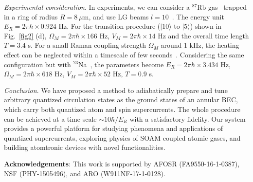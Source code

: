 \documentclass[twocolumn,prl,floatfix,citeautoscript,nofootinbib]{revtex4-1}
\begin{document}
\emph{Experimental consideration}. In experiments, we can consider a ${}^{87}
$Rb gas~\cite{Ramanathan2011,Wright2013} trapped in a ring of radius $%
R=8~\mu $m, and use LG beams $l=10$~\cite{Moulder2012}. The energy unit $%
E_{R}=2\pi \hbar \times 0.924$ Hz. For the transition procedure ($|10\rangle
$ to $|5\rangle $) shown in Fig.~\ref{fig2} (d), $\Omega _{M}=2\pi \hbar
\times 166$ Hz, $V_{M}=2\pi \hbar \times 14$ Hz and the overall time length $%
T=3.4$ s. For a small Raman coupling strength $\Omega _{M}$ around $1$ kHz,
the heating effect can be neglected within a timescale of few seconds~\cite%
{Wei2013}. Considering the same configuration but with ${}^{23}$Na~\cite%
{Stenger1998}, the parameters become $E_{R}=2\pi \hbar \times 3.434$ Hz, $%
\Omega _{M}=2\pi \hbar \times 618$ Hz, $V_{M}=2\pi \hbar \times 52$ Hz, $%
T=0.9$ s.


\emph{Conclusion}. We have proposed a method to adiabatically prepare and
tune arbitrary quantized circulation states as the ground states of an
annular BEC, which carry both quantized atom and spin supercurrents. The
whole procedure can be achieved at a time scale $\sim 10\hbar /E_{R}$ with a
satisfactory fidelity. Our system provides a powerful platform for studying
phenomena and applications of quantized supercurrents, exploring physics of
SOAM coupled atomic gases, and building atomtronic devices with novel
functionalities.


\textbf{Acknowledgements}: This work is supported by AFOSR
(FA9550-16-1-0387), NSF (PHY-1505496), and ARO (W911NF-17-1-0128).

\end{document}
